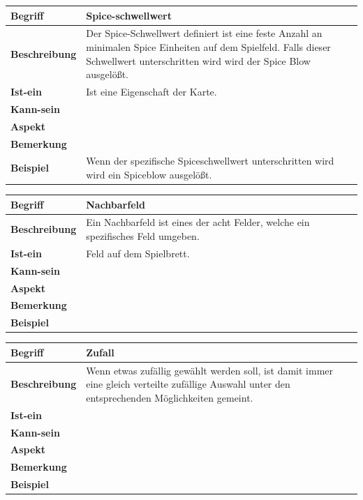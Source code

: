 \documentclass[12pt]{article}
\newcounter{fa}
\begin{document}
\begin{tabularx}{16cm}{|l|X|}
\hline
\textbf{Begriff} & \textbf{Spice-schwellwert } \\
\hline
\textbf{Beschreibung} & Der Spice-Schwellwert definiert ist eine feste Anzahl an minimalen Spice Einheiten auf dem Spielfeld. Falls dieser Schwellwert unterschritten wird wird der Spice Blow ausgelößt. \\
\hline
\textbf{Ist-ein} & Ist eine Eigenschaft der Karte.\\
\hline
\textbf{Kann-sein} & \\
\hline
\textbf{Aspekt} &  \\
\hline
\textbf{Bemerkung} & \\
\hline
\textbf{Beispiel} & Wenn der spezifische Spiceschwellwert unterschritten wird wird ein Spiceblow ausgelößt. \\
\hline
\end{tabularx}

\begin{tabularx}{16cm}{|l|X|}
\hline
\textbf{Begriff} & \textbf{Nachbarfeld } \\
\hline
\textbf{Beschreibung} & Ein Nachbarfeld ist eines der acht Felder, welche ein spezifisches Feld umgeben. \\
\hline
\textbf{Ist-ein} & Feld auf dem Spielbrett. \\
\hline
\textbf{Kann-sein} & \\
\hline
\textbf{Aspekt} &  \\
\hline
\textbf{Bemerkung} & \\
\hline
\textbf{Beispiel} & \\
\hline
\end{tabularx}

\begin{tabularx}{16cm}{|l|X|}
\hline
\textbf{Begriff} & \textbf{Zufall  } \\
\hline
\textbf{Beschreibung} & Wenn etwas zufällig gewählt werden soll, ist damit immer eine gleich verteilte zufällige Auswahl unter den
entsprechenden Möglichkeiten gemeint. \\
\hline
\textbf{Ist-ein} & \\
\hline
\textbf{Kann-sein} & \\
\hline
\textbf{Aspekt} &  \\
\hline
\textbf{Bemerkung} & \\
\hline
\textbf{Beispiel} & \\
\hline
\end{tabularx}
\end{document}
